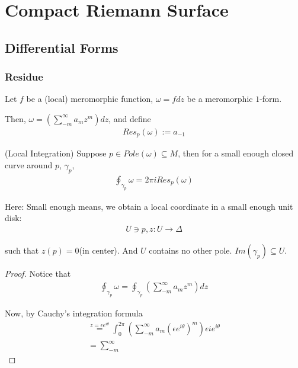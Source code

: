 \documentclass[Total.tex]{subfiles}
\begin{document}
		\section{Compact Riemann Surface}
			\subsection{Differential Forms}
				\subsubsection{Residue}
					\begin{Def}
						Let $f$ be a (local) meromorphic function, $\omega=fdz$ be a meromorphic $1$-form.  
						
						Then, $\omega=(\sum_{-m}^\infty a_mz^m)dz$, and define 
						\begin{gather*}
							Res_p(\omega):=a_{-1}
						\end{gather*}
					\end{Def}
					
					\begin{lemma}
						(Local Integration) Suppose $p\in Pole(\omega)\subseteq M$, then for a small enough closed curve around $p$, $\gamma_p$, 
						\begin{gather*}
							\oint_{\gamma_p} \omega=2\pi i Res_p(\omega)
						\end{gather*}
						
						Here: Small enough means, we obtain a local coordinate in a small enough unit disk:
						\begin{gather*}
							U\ni p,z:U\rightarrow \Delta
						\end{gather*}
						
						such that $z(p)=0$(in center). And $U$ contains no other pole. $Im(\gamma_p)\subseteq U$. 
					\end{lemma}
					\begin{proof}
						Notice that
						\begin{gather*}
							\oint_{\gamma_p} \omega=\oint_{\gamma_p} (\sum_{-m}^\infty a_m z^m)dz
						\end{gather*}
						
						Now, by Cauchy's integration formula
						\begin{gather*}
							\stackrel{z=\epsilon e^{i\theta}}{=}\int_0^{2\pi} (\sum_{-m}^\infty a_m (\epsilon e^{i\theta})^m)\epsilon ie^{i\theta}\\
							=\sum_{-m}^\infty 
						\end{gather*}
					\end{proof}
					
\end{document}
